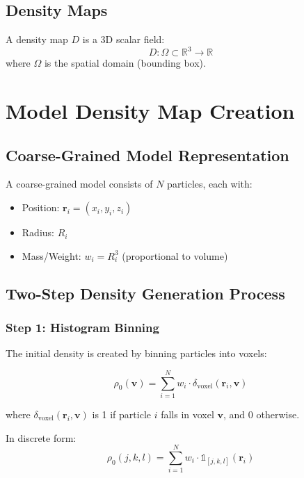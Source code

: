 \documentclass[12pt,a4paper]{article}
\begin{document}
\subsection{Density Maps}
A density map $D$ is a 3D scalar field:
\begin{equation}
D: \Omega \subset \mathbb{R}^3 \rightarrow \mathbb{R}
\end{equation}
where $\Omega$ is the spatial domain (bounding box).

\section{Model Density Map Creation}

\subsection{Coarse-Grained Model Representation}
A coarse-grained model consists of $N$ particles, each with:
\begin{itemize}
    \item Position: $\mathbf{r}_i = (x_i, y_i, z_i)$
    \item Radius: $R_i$
    \item Mass/Weight: $w_i = R_i^3$ (proportional to volume)
\end{itemize}

\subsection{Two-Step Density Generation Process}

\subsubsection{Step 1: Histogram Binning}
The initial density is created by binning particles into voxels:

\begin{equation}
\rho_0(\mathbf{v}) = \sum_{i=1}^{N} w_i \cdot \delta_{\text{voxel}}(\mathbf{r}_i, \mathbf{v})
\end{equation}

where $\delta_{\text{voxel}}(\mathbf{r}_i, \mathbf{v})$ is 1 if particle $i$ falls in voxel $\mathbf{v}$, and 0 otherwise.

In discrete form:
\begin{equation}
\rho_0(j, k, l) = \sum_{i=1}^{N} w_i \cdot \mathbb{1}_{[j,k,l]}(\mathbf{r}_i)
\end{equation}
\end{document}
